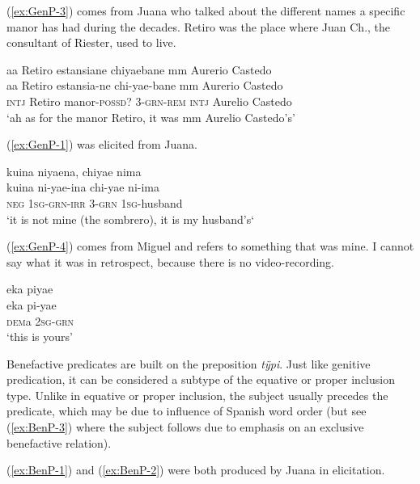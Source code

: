 (\ref{ex:GenP-3}) comes from Juana who talked about the different names a specific manor has had during the decades. Retiro was the place where Juan Ch., the consultant of Riester, used to live.

\ea\label{ex:GenP-3}
\begingl
\glpreamble aa Retiro estansiane chiyaebane mm Aurerio Castedo\\
\gla aa Retiro estansia-ne chi-yae-bane mm {Aurerio Castedo}\\
\glb \textsc{intj} Retiro manor-\textsc{possd}? 3-\textsc{grn}-\textsc{rem} \textsc{intj} {Aurelio Castedo}\\
\glft ‘ah as for the manor Retiro, it was mm Aurelio Castedo’s’
\endgl
\trailingcitation{[jxx-p120430l-2.019]}
\xe

(\ref{ex:GenP-1}) was elicited from Juana.

\ea\label{ex:GenP-1}
\begingl 
\glpreamble kuina niyaena, chiyae nima\\
\gla kuina ni-yae-ina chi-yae ni-ima\\ 
\glb \textsc{neg} 1\textsc{sg}-\textsc{grn}-\textsc{irr} 3-\textsc{grn} 1\textsc{sg}-husband\\ 
\glft ‘it is not mine (the sombrero), it is my husband's‘\\ 
\endgl
\trailingcitation{[jxx-e081025s-1.123]}
\xe

(\ref{ex:GenP-4}) comes from Miguel and refers to something that was mine. I cannot say what it was in retrospect, because there is no video-recording.

\ea\label{ex:GenP-4}
\begingl
\glpreamble eka piyae\\
\gla eka pi-yae\\
\glb \textsc{dem}a 2\textsc{sg}-\textsc{grn}\\
\glft ‘this is yours’
\endgl
\trailingcitation{[mrx-c120509l.030]}
\xe


Benefactive predicates are built on the  preposition \textit{tÿpi}. Just like genitive predication, it can be considered a subtype of the equative or proper inclusion type. Unlike in equative or proper inclusion, the subject usually precedes the predicate, which may be due to influence of Spanish word order (but see (\ref{ex:BenP-3}) where the subject follows due to emphasis on an exclusive benefactive relation).

(\ref{ex:BenP-1}) and (\ref{ex:BenP-2}) were both produced by Juana in elicitation.

